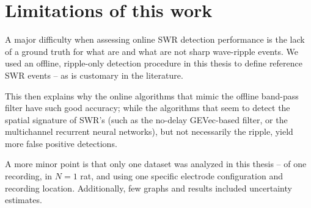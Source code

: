 \section{Limitations of this work}
\label{sec:limits}

A major difficulty when assessing online SWR detection performance is the lack of a ground truth for what are and what are not sharp wave-ripple events. We used an offline, ripple-only detection procedure in this thesis to define reference SWR events -- as is customary in the literature.

This then explains why the online algorithms that mimic the offline band-pass filter have such good accuracy; while the algorithms that seem to detect the spatial signature of SWR's (such as the no-delay GEVec-based filter, or the multichannel recurrent neural networks), but not necessarily the ripple, yield more false positive detections.

A more minor point is that only one dataset was analyzed in this thesis -- of one recording, in $N = 1$ rat, and using one specific electrode configuration and recording location. Additionally, few graphs and results included uncertainty estimates.
